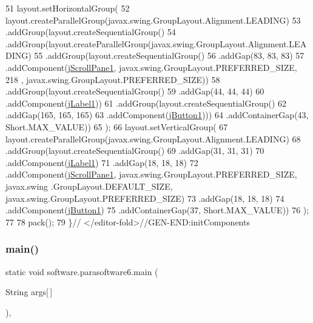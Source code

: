 \begin{DoxyCode}
51         layout.setHorizontalGroup(
52             layout.createParallelGroup(javax.swing.GroupLayout.Alignment.LEADING)
53             .addGroup(layout.createSequentialGroup()
54                 .addGroup(layout.createParallelGroup(javax.swing.GroupLayout.Alignment.LEADING)
55                     .addGroup(layout.createSequentialGroup()
56                         .addGap(83, 83, 83)
57                         .addComponent(\mbox{\hyperlink{classsoftware_1_1parasoftware6_a1ce3e9e74a88099c65ad960cee26aa87}{jScrollPane1}}, javax.swing.GroupLayout.PREFERRED\_SIZE, 218
      , javax.swing.GroupLayout.PREFERRED\_SIZE))
58                     .addGroup(layout.createSequentialGroup()
59                         .addGap(44, 44, 44)
60                         .addComponent(\mbox{\hyperlink{classsoftware_1_1parasoftware6_a4c4a13bf028651697609279d113c6103}{jLabel1}}))
61                     .addGroup(layout.createSequentialGroup()
62                         .addGap(165, 165, 165)
63                         .addComponent(\mbox{\hyperlink{classsoftware_1_1parasoftware6_a82af1fccb2dc3615434e773e93577e3e}{jButton1}})))
64                 .addContainerGap(43, Short.MAX\_VALUE))
65         );
66         layout.setVerticalGroup(
67             layout.createParallelGroup(javax.swing.GroupLayout.Alignment.LEADING)
68             .addGroup(layout.createSequentialGroup()
69                 .addGap(31, 31, 31)
70                 .addComponent(\mbox{\hyperlink{classsoftware_1_1parasoftware6_a4c4a13bf028651697609279d113c6103}{jLabel1}})
71                 .addGap(18, 18, 18)
72                 .addComponent(\mbox{\hyperlink{classsoftware_1_1parasoftware6_a1ce3e9e74a88099c65ad960cee26aa87}{jScrollPane1}}, javax.swing.GroupLayout.PREFERRED\_SIZE, javax.swing
      .GroupLayout.DEFAULT\_SIZE, javax.swing.GroupLayout.PREFERRED\_SIZE)
73                 .addGap(18, 18, 18)
74                 .addComponent(\mbox{\hyperlink{classsoftware_1_1parasoftware6_a82af1fccb2dc3615434e773e93577e3e}{jButton1}})
75                 .addContainerGap(37, Short.MAX\_VALUE))
76         );
77 
78         pack();
79     \}\textcolor{comment}{// </editor-fold>//GEN-END:initComponents}
\end{DoxyCode}
\mbox{\label{classsoftware_1_1parasoftware6_a3fe3a82fe5555adc90d4ead4b3078435}} 
\subsubsection{\texorpdfstring{main()}{main()}}
{\footnotesize\ttfamily static void software.\+parasoftware6.\+main (\begin{DoxyParamCaption}\item[{String}]{args\mbox{[}$\,$\mbox{]} }\end{DoxyParamCaption})\hspace{0.3cm}{\ttfamily [inline]}, {\ttfamily [static]}}


